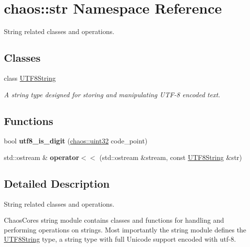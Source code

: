 \hypertarget{namespacechaos_1_1str}{}\section{chaos\+:\+:str Namespace Reference}
\label{namespacechaos_1_1str}


String related classes and operations.  


\subsection*{Classes}
\begin{DoxyCompactItemize}
\item 
class \hyperlink{classchaos_1_1str_1_1_u_t_f8_string}{U\+T\+F8\+String}
\begin{DoxyCompactList}\small\item\em A string type designed for storing and manipulating U\+T\+F-\/8 encoded text. \end{DoxyCompactList}\end{DoxyCompactItemize}
\subsection*{Functions}
\begin{DoxyCompactItemize}
\item 
\hypertarget{namespacechaos_1_1str_adc9b55515e06b320356d219cb573b20e}{}bool {\bfseries utf8\+\_\+is\+\_\+digit} (\hyperlink{namespacechaos_a3b3a47ba1e284655bf1a30c441121c60}{chaos\+::uint32} code\+\_\+point)\label{namespacechaos_1_1str_adc9b55515e06b320356d219cb573b20e}

\item 
\hypertarget{namespacechaos_1_1str_af8ed01c19bc2b322f36a751694e2dd0c}{}std\+::ostream \& {\bfseries operator$<$$<$} (std\+::ostream \&stream, const \hyperlink{classchaos_1_1str_1_1_u_t_f8_string}{U\+T\+F8\+String} \&str)\label{namespacechaos_1_1str_af8ed01c19bc2b322f36a751694e2dd0c}

\end{DoxyCompactItemize}


\subsection{Detailed Description}
String related classes and operations. 

Chaos\+Core\textquotesingle{}s string module contains classes and functions for handling and performing operations on strings. Most importantly the string module defines the \hyperlink{classchaos_1_1str_1_1_u_t_f8_string}{U\+T\+F8\+String} type, a string type with full Unicode support encoded with utf-\/8. 